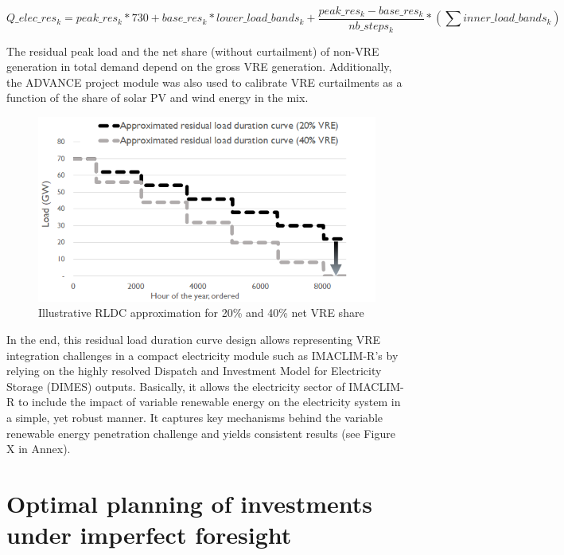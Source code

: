 { %
 
\begin{dmath}
        Q\_elec\_res_k =
        {peak\_res_k} * 730 + 
        {base\_res_k} * {lower\_load\_bands_k} +  
        \frac{peak\_res_k - base\_res_k}{nb\_steps_k} * ( \sum inner\_load\_bands_k) 
    \label{eqn:elecQres}
\end{dmath}


 The residual peak load and the net share (without curtailment) of non-VRE generation in total demand depend on the gross VRE generation. Additionally, the ADVANCE project module was also used to calibrate VRE curtailments as a function of the share of solar PV and wind energy in the mix. %
\begin{figure}[H]
\includegraphics[scale=0.8]{figures&tables/LDC&RLDC.png}
\centering
\caption{Illustrative RLDC approximation for 20\% and 40\% net VRE share}
\label{fig:RLDCapprox}
\end{figure}

In the end, this residual load duration curve design allows representing VRE integration challenges in a compact electricity module such as IMACLIM-R's by relying on the highly resolved Dispatch and Investment Model for Electricity Storage (DIMES)  outputs. Basically, it allows the electricity sector of IMACLIM-R to include the impact of variable renewable energy on the electricity system in a simple, yet robust manner. It captures key mechanisms behind the variable renewable energy penetration challenge and yields consistent results (see Figure X in Annex).



\section{Optimal planning of investments under imperfect foresight}

}
